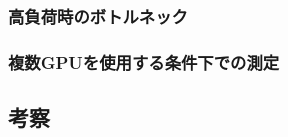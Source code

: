 \documentclass[../main.tex]{subfiles}
\begin{document}
\subsubsection{高負荷時のボトルネック}
\subsubsection{複数GPUを使用する条件下での測定}

\subsection{考察}




\end{document}
